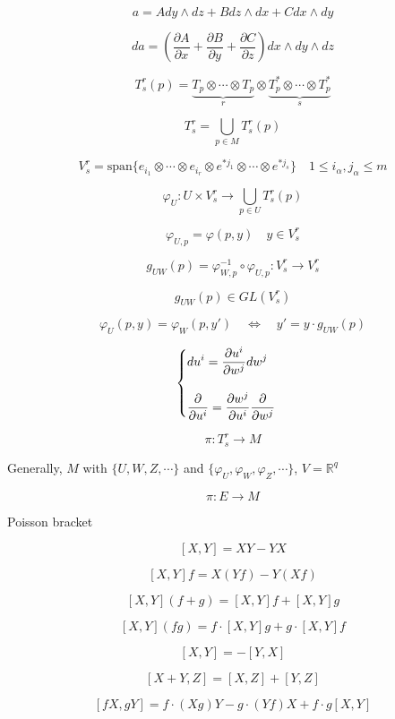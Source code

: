 \documentclass[12pt,a4paper]{article}
\begin{document}
\[
a = Ady\wedge dz + Bdz \wedge dx + Cdx \wedge dy
\]

\[
da = \left( \frac{\partial A}{\partial x} + \frac{\partial B}{\partial y}+ \frac{\partial C}{\partial z}  \right) dx\wedge dy \wedge dz
\]


\[
T^r_s(p) = \underbrace{T_p \otimes \cdots \otimes T_p}_r \otimes \underbrace{T_p^* \otimes \cdots \otimes T_p^*}_s
\]

\[
T^r_s = \bigcup_{p \in M}T^r_s(p)
\]

\[
V^r_s = \mathrm{span}\{
	e_{i_1} \otimes \cdots \otimes e_{i_r} 
	\otimes 
	e^{*j_1} \otimes \cdots \otimes e^{*j_s}
	\} \quad 1 \leq i_{\alpha}, j_{\alpha} \leq m 
\]

\[
\varphi_U : U \times V^r_s \rightarrow \bigcup_{p \in U}T^r_s(p)
\]

\[
\varphi_{U,p} = \varphi(p,y) \quad y \in V^r_s
\]

\[
g_{UW}(p) = \varphi_{W,p}^{-1} \circ \varphi_{U,p} : V^r_s \rightarrow V^r_s
\]

\[
g_{UW}(p) \in GL(V^r_s)
\]

\[
\varphi_U(p,y) = \varphi_W(p,y')  \quad \Leftrightarrow \quad y' = y \cdot g_{UW}(p)
\]


\[
\begin{cases}
  \displaystyle du^i  = \frac{\partial u^i}{\partial w^j}dw^j \\
  \scriptscriptstyle \\
 \displaystyle \frac{\partial}{\partial u^i}  =  \frac{\partial w^j}{\partial u^i} \frac{\partial}{\partial w^j} \\
 \end{cases}
\]


\[
\pi: T^r_s \rightarrow M
\]


Generally, $M$ with $\{U,W,Z,\cdots\}$ and  $\{\varphi_U,\varphi_W,\varphi_Z,\cdots\}$, $V = \mathbb{R}^q$

\[
\pi: E \rightarrow M
\]

Poisson bracket

\[
[X,Y] = XY - YX
\]

\[
[X,Y]f = X(Yf) - Y(Xf)
\]

\[
[X,Y](f+g) = [X,Y]f + [X,Y]g
\]

\[
[X,Y](fg) = f\cdot [X,Y]g + g \cdot [X,Y]f
\]

\[
[X,Y] = -[Y,X]
\]

\[
[X+Y,Z] = [X,Z] + [Y,Z]
\]

\[
[fX,gY] = f\cdot (Xg)Y - g \cdot (Yf)X + f\cdot g [X,Y]
\]
\end{document}

